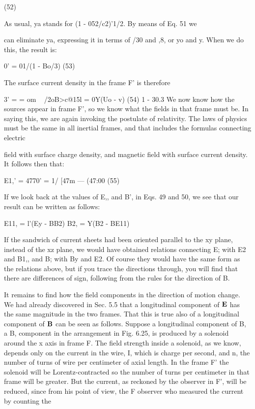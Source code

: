 \begin{equation}
\end{equation}
(52)

As usual, ya stands for (1 - 052/c2)'1/2. By means of Eq. 51 we

can eliminate ya, expressing it in terms of /30 and ,8, or yo and y.
When we do this, the result is:

\begin{equation}
\end{equation}
0' = 01/(1 - Bo/3) (53)

The surface current density in the frame F' is therefore

\begin{equation}
\end{equation}
3' =  = om ~ /2oB>c@15l = 0Y(Uo - v) (54)
1 - 30.3
We now know how the sources appear in frame F', so we know what
the fields in that frame must be. In saying this, we are again invoking
the postulate of relativity. The laws of physics must be the same in
all inertial frames, and that includes the formulas connecting electric

field with surface charge density, and magnetic field with surface
current density. It follows then that:

\begin{equation}
\end{equation}
E1,' = 4770' = 1/ [47m --- (47:00  (55)
 

If we look back at the values of E,, and B', in Eqs. 49 and 50, we see
that our result can be written as follows:

\begin{equation}
\end{equation}
E11, = l'(Ey - BB2)
B2, = Y(B2 - BE11)

If the sandwich of current sheets had been oriented parallel to the
xy plane, instead of the xz plane, we would have obtained relations
connecting E; with E2 and B1,, and B; with By and E2. Of course they
would have the same form as the relations above, but if you trace
the directions through, you will find that there are differences of sign,
following from the rules for the direction of B.

It remains to find how the field components in the direction of
motion change. We had already discovered in Sec. 5.5 that a longitudinal
component of $\mathbf{E}$ has the same magnitude in the two frames.
That this is true also of a longitudinal component of $\mathbf{B}$ can be seen
as follows. Suppose a longitudinal component of B, a B, component
in the arrangement in Fig. 6.25, is produced by a solenoid around the
x axis in frame F. The field strength inside a solenoid, as we know,
depends only on the current in the wire, I, which is charge per second,
and n, the number of turns of wire per centimeter of axial length.
In the frame F' the solenoid will be Lorentz-contracted so the number
of turns per centimeter in that frame will be greater. But the current,
as reckoned by the observer in F', will be reduced, since from his point
of view, the F observer who measured the current by counting the

